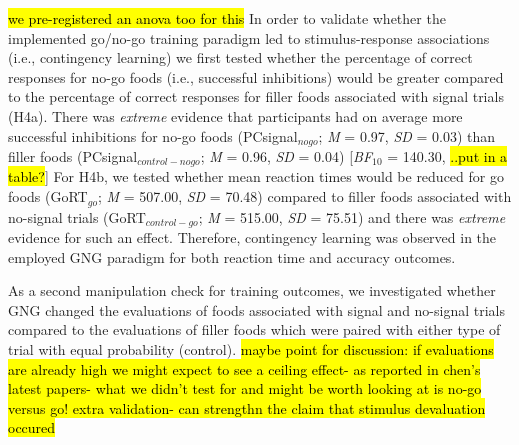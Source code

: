\documentclass[man,floatsintext]{apa6}
\begin{document}
\hl{we pre-registered an anova too for this} In order to validate
whether the implemented go/no-go training paradigm led to
stimulus-response associations (i.e., contingency learning) we first
tested whether the percentage of correct responses for no-go foods
(i.e., successful inhibitions) would be greater compared to the
percentage of correct responses for filler foods associated with signal
trials (H4a). There was \emph{extreme} evidence that participants had on
average more successful inhibitions for no-go foods
(PCsignal\(_{nogo}\); \emph{M} = 0.97, \emph{SD} = 0.03) than filler
foods (PCsignal\(_{control-nogo}\); \emph{M} = 0.96, \emph{SD} = 0.04)
{[}\emph{BF}\(_{10}\) = 140.30, \hl{..put in a table?}{]} For H4b, we
tested whether mean reaction times would be reduced for go foods
(GoRT\(_{go}\); \emph{M} = 507.00, \emph{SD} = 70.48) compared to filler
foods associated with no-signal trials (GoRT\(_{control-go}\); \emph{M}
= 515.00, \emph{SD} = 75.51) and there was \emph{extreme} evidence for
such an effect. Therefore, contingency learning was observed in the
employed GNG paradigm for both reaction time and accuracy outcomes.

\par

As a second manipulation check for training outcomes, we investigated
whether GNG changed the evaluations of foods associated with signal and
no-signal trials compared to the evaluations of filler foods which were
paired with either type of trial with equal probability (control).
\hl{maybe point for discussion: if evaluations are already high we might expect to see a ceiling effect- as reported in chen's latest papers- what we didn't test for and might be worth looking at is no-go versus go! extra validation- can strengthn the claim that stimulus devaluation occured}
\end{document}
